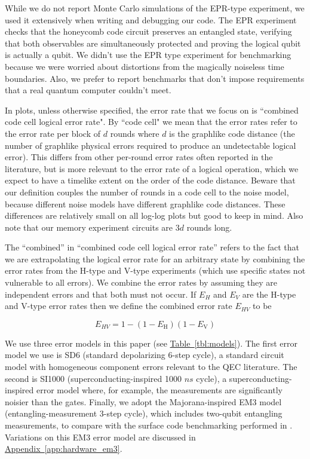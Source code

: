 \documentclass[onecolumn,unpublished,a4paper]{quantumarticle}
\theoremstyle{definition}
\theoremstyle{definition}
\theoremstyle{definition}
\DeclareRobustCommand{\app}[1]{\hyperref[app:#1]{Appendix~\ref*{app:#1}}}
\newcommand{\tbl}[1]{\hyperref[tbl:#1]{Table~\ref*{tbl:#1}}}
\begin{document}
While we do not report Monte Carlo simulations of the EPR-type experiment, we used it extensively when writing and debugging our code.
The EPR experiment checks that the honeycomb code circuit preserves an entangled state, verifying that both observables are simultaneously protected and proving the logical qubit is actually a qubit.
We didn't use the EPR type experiment for benchmarking because we were worried about distortions from the magically noiseless time boundaries.
Also, we prefer to report benchmarks that don't impose requirements that a real quantum computer couldn't meet.

In plots, unless otherwise specified, the error rate that we focus on is ``combined code cell logical error rate".
By ``code cell" we mean that the error rates refer to the error rate per block of $d$ rounds where $d$ is the graphlike code distance (the number of graphlike physical errors required to produce an undetectable logical error).
This differs from other per-round error rates often reported in the literature, but is more relevant to the error rate of a logical operation, which we expect to have a timelike extent on the order of the code distance.  
Beware that our definition couples the number of rounds in a code cell to the noise model, because different noise models have different graphlike code distances.
These differences are relatively small on all log-log plots but good to keep in mind.
Also note that our memory experiment circuits are $3d$ rounds long.

The ``combined'' in ``combined code cell logical error rate'' refers to the fact that we are extrapolating the logical error rate for an arbitrary state by combining the error rates from the H-type and V-type experiments (which use specific states not vulnerable to all errors).
We combine the error rates by assuming they are independent errors and that both must not occur.
If $E_H$ and $E_V$ are the H-type and V-type error rates then we define the combined error rate $E_{HV}$ to be

\begin{equation}
    E_{HV} = 1 - (1 - E_{\text{H}}) (1 -  E_{\text{V}})
    \label{eq:combined_logical_error}
\end{equation}

We use three error models in this paper (see \tbl{models}).
The first error model we use is SD6 (standard depolarizing 6-step cycle), a standard circuit model with homogeneous component errors relevant to the QEC literature.
The second is SI1000 (superconducting-inspired 1000 $ns$ cycle), a superconducting-inspired error model where, for example, the measurements are significantly noisier than the gates.  
Finally, we adopt the Majorana-inspired EM3 model (entangling-measurement 3-step cycle), which includes two-qubit entangling measurements, to compare with the surface code benchmarking performed in \cite{chao2020optimization}. Variations on this EM3 error model are discussed in \app{hardware_em3}.
\end{document}
